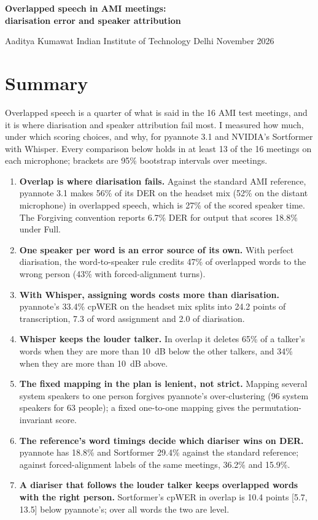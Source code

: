 \documentclass[11pt,a4paper]{article}
\begin{document}
\begin{center}
  {\LARGE\bfseries Overlapped speech in AMI meetings:\\[3pt] diarisation error and speaker attribution\par}
  \vspace{12pt}
  {Aaditya Kumawat \quad\textperiodcentered\quad Indian Institute of Technology Delhi \quad\textperiodcentered{} November 2026\par}
\end{center}
\vspace{4pt}

\section*{Summary}

Overlapped speech is a quarter of what is said in the 16 AMI test meetings, and it is where diarisation and speaker attribution fail most. I measured how much, under which scoring choices, and why, for pyannote 3.1 and NVIDIA's Sortformer with Whisper. Every comparison below holds in at least 13 of the 16 meetings on each microphone; brackets are 95\% bootstrap intervals over meetings.

\begin{enumerate}[leftmargin=*, label=\arabic*.]
  \item \textbf{Overlap is where diarisation fails.} Against the standard AMI reference, pyannote 3.1 makes 56\% of its DER on the headset mix (52\% on the distant microphone) in overlapped speech, which is 27\% of the scored speaker time. The Forgiving convention reports 6.7\% DER for output that scores 18.8\% under Full.
  \item \textbf{One speaker per word is an error source of its own.} With perfect diarisation, the word-to-speaker rule credits 47\% of overlapped words to the wrong person (43\% with forced-alignment turns).
  \item \textbf{With Whisper, assigning words costs more than diarisation.} pyannote's 33.4\% cpWER on the headset mix splits into 24.2 points of transcription, 7.3 of word assignment and 2.0 of diarisation.
  \item \textbf{Whisper keeps the louder talker.} In overlap it deletes 65\% of a talker's words when they are more than 10~dB below the other talkers, and 34\% when they are more than 10~dB above.
  \item \textbf{The fixed mapping in the plan is lenient, not strict.} Mapping several system speakers to one person forgives pyannote's over-clustering (96 system speakers for 63 people); a fixed one-to-one mapping gives the permutation-invariant score.
  \item \textbf{The reference's word timings decide which diariser wins on DER.} pyannote has 18.8\% and Sortformer 29.4\% against the standard reference; against forced-alignment labels of the same meetings, 36.2\% and 15.9\%.
  \item \textbf{A diariser that follows the louder talker keeps overlapped words with the right person.} Sortformer's cpWER in overlap is 10.4 points [5.7, 13.5] below pyannote's; over all words the two are level.
\end{enumerate}
\end{document}
